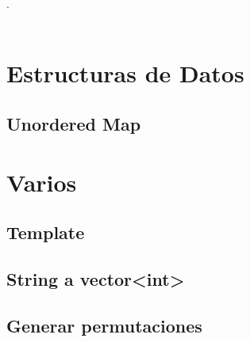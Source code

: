 

\def\title{Competitive Programing Reference}
.\\[0.2cm]
 \\[0.5cm]
\tableofcontents\newpage

\section{Estructuras de Datos}
	\subsection{Unordered Map}
	

\section{Varios}
	\subsection{Template}
	\subsection{String a vector<int>}
	\subsection{Generar permutaciones}


